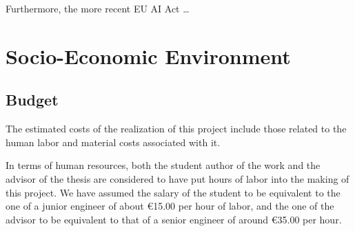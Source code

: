 \documentclass[../main.tex]{subfiles}
\begin{document}
Furthermore, the more recent EU AI Act \cite{eu_aiact_2023}\dots



\chapter*{Socio-Economic Environment} \label{chap:socioeconomic}



\section*{Budget} \label{budget}
\vspace*{-0.05cm}

The estimated costs of the realization of this project include those related to the human labor and material costs associated with it.

In terms of human resources, both the student author of the work and the advisor of the thesis are considered to have put hours of labor into the making of this project. We have assumed the salary of the student to be equivalent to the one of a junior engineer of about €15.00 per hour of labor, and the one of the advisor to be equivalent to that of a senior engineer of around €35.00 per hour. 
\end{document}
